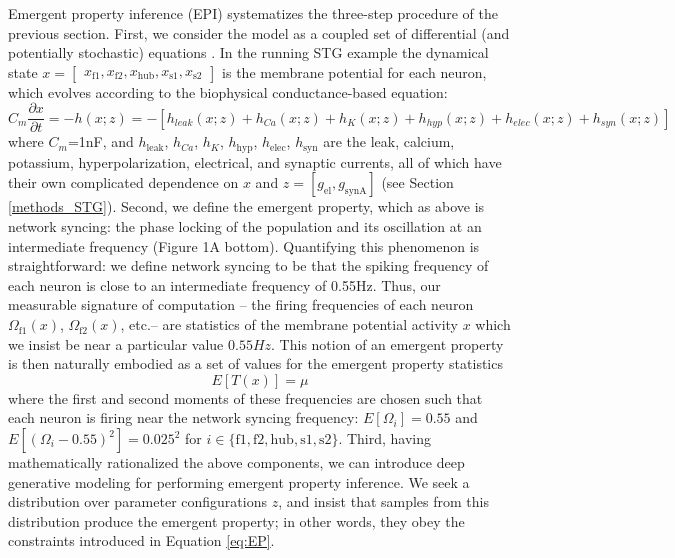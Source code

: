 \documentclass[11pt]{article}
\begin{document}
Emergent property inference (EPI) systematizes the three-step procedure of the previous section.
First, we consider the model as a coupled set of differential (and potentially stochastic) equations \cite{gutierrez2013multiple}.  In the running STG example the dynamical state $x = \begin{bmatrix} x_{\text{f1}}, x_{\text{f2}}, x_{\text{hub}}, x_{\text{s1}}, x_{\text{s2}} \end{bmatrix}$ is the membrane potential for each neuron, which evolves according to the biophysical conductance-based equation:
\begin{equation} C_m \frac{\partial x}{\partial t} = -h(x; z) = - \left[ h_{leak}(x; z) + h_{Ca}(x; z) + h_K(x; z) + h_{hyp}(x; z) + h_{elec}(x; z) + h_{syn}(x; z)\right] 
\end{equation} 
where $C_m$=1nF, and $h_{\text{leak}}$, $h_{Ca}$, $h_K$, $h_{\text{hyp}}$, $h_{\text{elec}}$, $h_{\text{syn}}$ are the leak, calcium, potassium, hyperpolarization, electrical, and synaptic currents, all of which have their own complicated dependence on $x$ and $z = [g_{\text{el}}, g_{\text{synA}}]$ (see Section \ref{methods_STG}).
Second, we define the emergent property, which as above is network syncing: the phase locking of the population and its oscillation at an intermediate frequency (Figure 1A bottom).
Quantifying this phenomenon is straightforward: we define network syncing to be that the spiking frequency of each neuron is close to an intermediate frequency of 0.55Hz.  Thus, our measurable signature of computation -- the firing frequencies of each neuron $\Omega_{\text{f1}}(x)$, $\Omega_{\text{f2}}(x)$, etc.-- are statistics of the membrane potential activity $x$ which we insist be near a particular value $0.55Hz$.  This notion of an emergent property is then naturally embodied as a set of values for the emergent property statistics
\begin{equation}\label{eq:EP}
 E\left[T(x) \right] =\mu
 \end{equation}
where the first and second moments of these frequencies are chosen such that each neuron is firing near the network syncing frequency: $E\left[\Omega_i \right] = 0.55$ and $E\left[(\Omega_i - 0.55)^2 \right] = 0.025^2$ for $i \in \{ \text{f1}, \text{f2}, \text{hub}, \text{s1}, \text{s2} \}$.
Third, having mathematically rationalized the above components, we can introduce deep generative modeling for performing emergent property inference.
We seek a distribution over parameter configurations $z$, and insist that samples from this distribution produce the emergent property; in other words, they obey the constraints introduced in Equation \ref{eq:EP}.  
\end{document}
